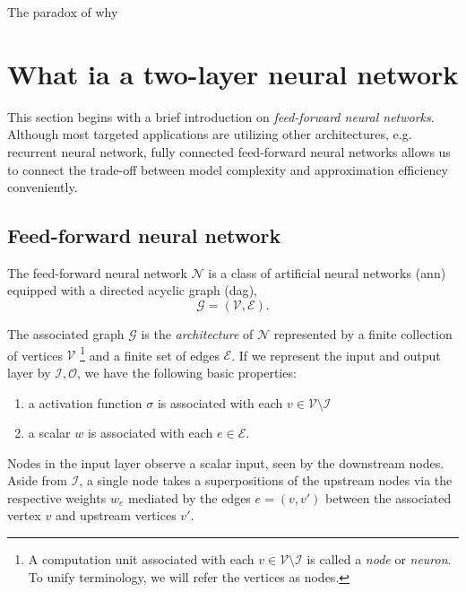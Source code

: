 The paradox of why 


\section{What ia a two-layer neural network}

This section begins with a brief introduction on \textit{feed-forward neural
networks}. Although most targeted applications are utilizing other architectures,
e.g. recurrent neural network, fully connected feed-forward neural
networks allows us to connect the trade-off between model complexity and
approximation efficiency conveniently.

\subsection{Feed-forward neural network}

The feed-forward neural network $\mathcal{N}$ is a class of artificial neural
networks (\gls{ann}) equipped with a directed acyclic graph (\gls{dag}),
\begin{equation*}
    \mathcal{G} = (\mathcal{V}, \mathcal{E}).
\end{equation*}

The associated graph $\mathcal{G}$ is the \textit{architecture} of $\mathcal{N}$
represented by a finite collection of vertices $\mathcal{V}$ 
\footnote{
    A computation unit associated with each $v \in \mathcal{V} \setminus \mathcal{I}$
    is called a \textit{node} or \textit{neuron}. To unify terminology, we will 
    refer the vertices as nodes.
}
and a finite set of edges $\mathcal{E}$. If we represent the input and output
layer by $\mathcal{I, O}$, we have the following basic properties: 
\begin{enumerate}
    \item a activation function $\sigma$ is associated with each $v \in
    \mathcal{V} \setminus \mathcal{I}$
    \item a scalar $w$ is associated with each $e \in
    \mathcal{E}$.    
\end{enumerate}

Nodes in the input layer observe a scalar input, seen by the downstream nodes.
Aside from $\mathcal{I}$, a single node takes a superpositions of the upstream
nodes via the respective weights $w_e$ mediated by the edges $e = (v, v')$
between the associated vertex $v$ and upstream vertices $v'$. 

